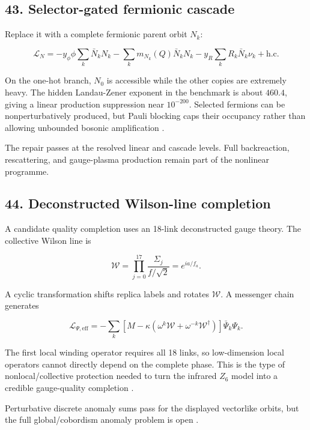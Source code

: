 \documentclass[
]{article}
\begin{document}
\subsection{43. Selector-gated fermionic
cascade}\label{selector-gated-fermionic-cascade}

Replace it with a complete fermionic parent orbit \(N_k\):

\[
\mathcal L_N
=-y_\phi\phi\sum_k\bar N_kN_k
-\sum_km_{N_k}(Q)\bar N_kN_k
-y_R\sum_kR_k\bar N_k\nu_k+\mathrm{h.c.}
\]

On the one-hot branch, \(N_0\) is accessible while the other copies are
extremely heavy. The hidden Landau-Zener exponent in the benchmark is
about \(460.4\), giving a linear production suppression near
\(10^{-200}\). Selected fermions can be nonperturbatively produced, but
Pauli blocking caps their occupancy rather than allowing unbounded
bosonic amplification .

The repair passes at the resolved linear and cascade levels. Full
backreaction, rescattering, and gauge-plasma production remain part of
the nonlinear programme.

\subsection{44. Deconstructed Wilson-line
completion}\label{deconstructed-wilson-line-completion}

A candidate quality completion uses an 18-link deconstructed gauge
theory. The collective Wilson line is

\[
\mathcal W
=\prod_{j=0}^{17}\frac{\Sigma_j}{f/\sqrt2}
=e^{ia/f_a}.
\]

A cyclic transformation shifts replica labels and rotates
\(\mathcal W\). A messenger chain generates

\[
\mathcal L_{\Psi,\mathrm{eff}}
=-\sum_k\left[
M-\kappa(\omega^k\mathcal W+\omega^{-k}\mathcal W^\dagger)
\right]\bar\Psi_k\Psi_k.
\]

The first local winding operator requires all 18 links, so low-dimension
local operators cannot directly depend on the complete phase. This is
the type of nonlocal/collective protection needed to turn the infrared
\(Z_6\) model into a credible gauge-quality completion
.

Perturbative discrete anomaly sums pass for the displayed vectorlike
orbits, but the full global/cobordism anomaly problem is open
.
\end{document}
